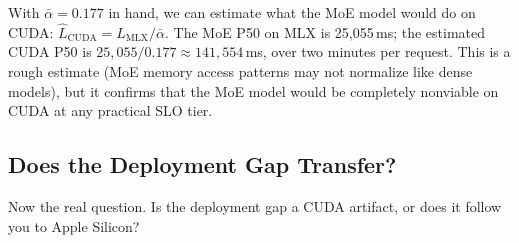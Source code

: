 \documentclass[11pt]{article}
\begin{document}
With $\bar{\alpha} = 0.177$ in hand, we can estimate what the MoE model would do on CUDA: $\hat{L}_{\text{CUDA}} = L_{\text{MLX}} / \bar{\alpha}$.  The MoE P50 on MLX is 25,055\,ms; the estimated CUDA P50 is $25{,}055 / 0.177 \approx 141{,}554$\,ms, over two minutes per request.  This is a rough estimate (MoE memory access patterns may not normalize like dense models), but it confirms that the MoE model would be completely nonviable on CUDA at any practical SLO tier.

\subsection{Does the Deployment Gap Transfer?}
\label{sec:gap-transfer}

Now the real question.  Is the deployment gap a CUDA artifact, or does it follow you to Apple Silicon?
\end{document}
